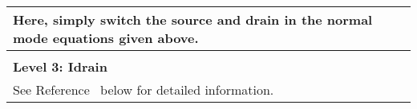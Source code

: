 \begin{longtable}[H]{>{\setlength{\hsize}{\textwidth}}W}
Here, simply switch the source and drain in the normal mode
equations given above.\\

\hline \\
\bf Level %
3: Idrain \\

See Reference~\cite{VL:1980} below for detailed information. \\

\end{longtable}

\addtocounter{table}{-1}


